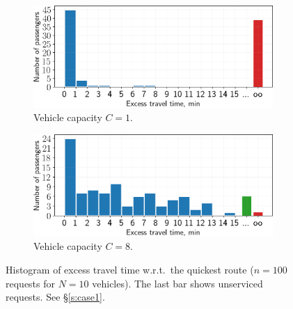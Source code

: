 \documentclass[12pt,notitlepage]{article}
\begin{document}
\begin{figure}[!p]
	
	\caption{%
		Passenger trajectories
		colored by excess travel time
		w.r.t.~the quickest route
		($n = 100$ requests for $N = 10$ vehicles).
		Empty red circles are unserviced pickup requests.
		Cf.~\S\ref{s:case1}.
	}
	\label{f:case1-traj}
	
	\vspace{2\baselineskip}
	
	\begin{subfigure}{0.5\textwidth}
		\includegraphics[width=\textwidth]{20210616-OPT1/c_grid_study0/UTC-20210619-074952/c_grid_visualize/8/excess_travel_time_hist}
		\caption{Vehicle capacity $C = 1$.}
	\end{subfigure}
	\begin{subfigure}{0.5\textwidth}
		\includegraphics[width=\textwidth]{20210616-OPT1/c_grid_study0/UTC-20210619-074952/c_grid_visualize/9/excess_travel_time_hist}
		
		\caption{Vehicle capacity $C = 8$.}
	\end{subfigure}
	
	\caption{%
		Histogram of excess travel time
		w.r.t.~the quickest route
		($n = 100$ requests for $N = 10$ vehicles).
		The last bar shows unserviced requests.
		See \S\ref{s:case1}.
	}
	\label{f:case1-hist}

	\vspace{2\baselineskip}
	

\end{figure}
\end{document}
